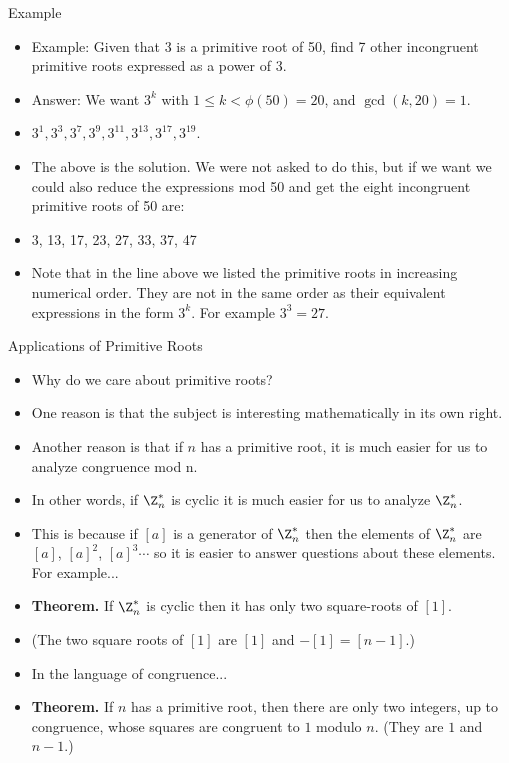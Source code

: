 \documentclass[handout]{beamer}
\begin{document}
\begin{frame}{Example}

\begin{itemize}
  \item Example: Given that 3 is a primitive root of 50, find 7 other incongruent primitive roots expressed as a power of 3.
  \item Answer: We want $3^k$ with $1\leq k < \phi(50)=20$, and $\gcd(k,20)=1$.
  \item $3^1,3^3,3^7,3^9,3^{11},3^{13},3^{17},3^{19}$.
  \item The above is the solution. We were not asked to do this, but if we want we could also reduce the expressions mod 50 and get
  the eight incongruent primitive roots of 50 are:
  \item 3, 13, 17, 23, 27, 33, 37, 47
  \item Note that in the line above we listed the primitive roots in increasing numerical order. They are not in the same order as their
  equivalent expressions in the form $3^k$. For example $3^3 = 27$.
\end{itemize}

\end{frame}

\begin{frame}{Applications of Primitive Roots}

\begin{itemize}
  \item Why do we care about primitive roots?
  \item One reason is that the subject is interesting mathematically in its own right.
  \item Another reason is that if $n$ has a primitive root, it is much easier for us to
  analyze congruence mod n.
  \item In other words, if $\Z_n^*$ is cyclic it is much easier for us to analyze $\Z_n^*$.
  \item This is because if $[a]$ is a generator of $\Z_n^*$ then the elements of
  $\Z_n^*$ are $[a]$, $[a]^2$, $[a]^3\cdots$ so it is easier to answer questions about these elements. For example...
  \item \textbf{Theorem.} If $\Z_n^*$ is cyclic then it has only two square-roots of $[1]$.
  \item (The two square roots of $[1]$ are $[1]$ and $-[1] = [n-1]$.)
  \item In the language of congruence...
  \item \textbf{Theorem.} If $n$ has a primitive root, then there are only two integers, up to congruence,
  whose squares are congruent to $1$ modulo $n$. (They are $1$ and $n-1$.)
\end{itemize}

\end{frame}
\end{document}
